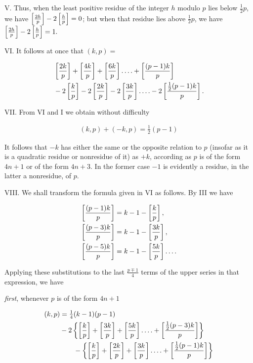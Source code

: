 V. Thus, when the least positive residue of the integer $h$ modulo $p$ lies below $\tfrac12p$, we have $\left[\frac{2h}{p}\right]-2\left[\frac{h}{p}\right]=0$; but when that residue lies above $\tfrac12p$, we have $\left[\frac{2h}{p}\right]-2\left[\frac{h}{p}\right]=1.$

VI. It follows at once that $(k,p)=$

\[
\begin{aligned}
&\left[\frac{2k}{p}\right]+\left[\frac{4k}{p}\right]+\left[\frac{6k}{p}\right]\mathinner{.\,.\,.\,.}+\left[\frac{(p-1)k}{p}\right]\\
&-2\left[\frac{k}{p}\right]-2\left[\frac{2k}{p}\right]-2\left[\frac{3k}{p}\right]\mathinner{.\,.\,.\,.}-2\left[\frac{\frac12(p-1)k}{p}\right].
\end{aligned}
\]

VII. From VI and I we obtain without difficulty

\[
\begin{aligned}
(k,p)+(-k,p)=\tfrac12(p-1)
\end{aligned}
\]

It follows that $-k$ has either the same or the opposite relation to $p$ (insofar as it is a quadratic residue or nonresidue of it) as $+k$, according as $p$ is of the form $4n+1$ or of the form $4n+3$. In the former case $-1$ is evidently a residue, in the latter a nonresidue, of $p$.

VIII. We shall transform the formula given in VI as follows. By III we have

\[
\begin{aligned}
\left[\frac{(p-1)k}{p}\right]&=k-1-\left[\frac{k}{p}\right],\\
\left[\frac{(p-3)k}{p}\right]&=k-1-\left[\frac{3k}{p}\right],\\
\left[\frac{(p-5)k}{p}\right]&=k-1-\left[\frac{5k}{p}\right]\mathinner{.\,.\,.\,.}
\end{aligned}
\]

Applying these substitutions to the last $\frac{p\mp1}{4}$ terms of the upper series in that expression, we have

\emph{first}, whenever $p$ is of the form $4n+1$

\[
\begin{aligned}
(k,p)&=\tfrac14(k-1)(p-1)\\
& -2\left\{\left[\frac{k}{p}\right]+\left[\frac{3k}{p}\right]+\left[\frac{5k}{p}\right]\mathinner{.\,.\,.\,.}+\left[\frac{\frac12(p-3)k}{p}\right]\right\}\\
&\qquad-\left\{\left[\frac{k}{p}\right]+\left[\frac{2k}{p}\right]+\left[\frac{3k}{p}\right]\mathinner{.\,.\,.\,.}+\left[\frac{\frac12(p-1)k}{p}\right]\right\}
\end{aligned}
\]

